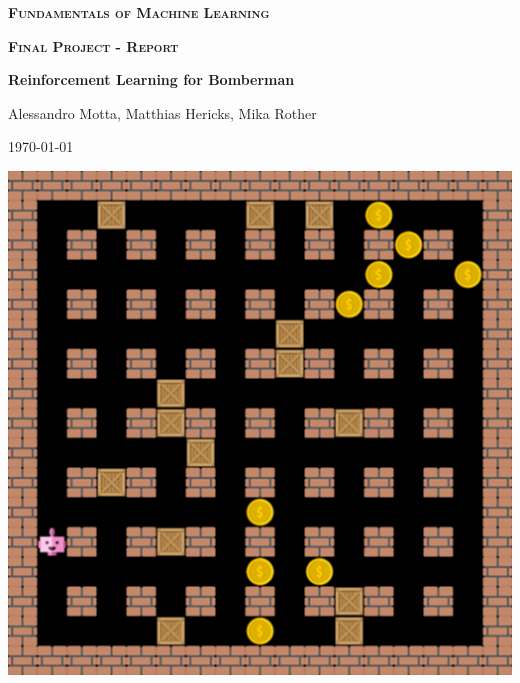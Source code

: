 
  


\pagestyle{empty}
\begin{center}
	\hrulefill
	\vspace{0.3cm}
	
    \huge
    \textbf{\textsc{Fundamentals of Machine Learning}}
        
    \vspace{0.6cm}
    \Large
    \textbf{\textsc{Final Project - Report}}
        
    \vspace{0.5cm}
    \large
    \textbf{Reinforcement Learning for Bomberman}
   
    
    \vspace{0.5cm}
    \Large 
    Alessandro Motta, Matthias Hericks, Mika Rother
    
    \vspace{0.6cm}
    \today
    
    \hrulefill
    \vspace{1.5cm}
    
    \includegraphics[scale=0.32]{graphics/title.png}
\end{center}
\tableofcontents





%
